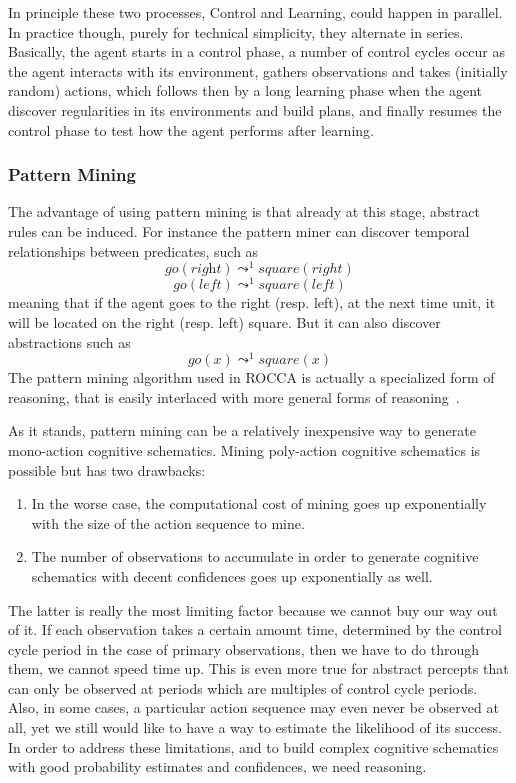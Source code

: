 \documentclass[runningheads]{llncs}
\newcommand{\lpreimp}[1]{\leadsto^{#1}}
\newcommand{\lgo}[1]{\textit{go}(#1)}
\begin{document}
In principle these two processes, Control and Learning, could happen
in parallel.  In practice though, purely for technical simplicity,
they alternate in series.  Basically, the agent starts in a control
phase, a number of control cycles occur as the agent interacts with
its environment, gathers observations and takes (initially random)
actions, which follows then by a long learning phase when the agent
discover regularities in its environments and build plans, and finally
resumes the control phase to test how the agent performs after
learning.

\subsubsection{Pattern Mining}

The advantage of using pattern mining is that already at this stage,
abstract rules can be induced.  For instance the pattern miner can
discover temporal relationships between predicates, such as
$$\lgo{\textit{right}} \lpreimp{1} square(right)$$
$$go(left) \lpreimp{1} square(left)$$
meaning that if the agent goes to the right (resp. left), at the next
time unit, it will be located on the right (resp. left) square.  But
it can also discover abstractions such as
$$\lgo{x} \lpreimp{1} square(x)$$
The pattern mining algorithm used in ROCCA is actually a specialized
form of reasoning, that is easily interlaced with more general forms
of reasoning~\cite{Geisweiller2019}.

As it stands, pattern mining can be a relatively inexpensive way to
generate mono-action cognitive schematics.  Mining poly-action
cognitive schematics is possible but has two drawbacks:
\begin{enumerate}
\item In the worse case, the computational cost of mining goes up
  exponentially with the size of the action sequence to mine.
\item The number of observations to accumulate in order to generate
  cognitive schematics with decent confidences goes up exponentially
  as well.
\end{enumerate}
The latter is really the most limiting factor because we cannot buy
our way out of it.  If each observation takes a certain amount time,
determined by the control cycle period in the case of primary
observations, then we have to do through them, we cannot speed time
up.  This is even more true for abstract percepts that can only be
observed at periods which are multiples of control cycle periods.
Also, in some cases, a particular action sequence may even never be
observed at all, yet we still would like to have a way to estimate the
likelihood of its success.  In order to address these limitations, and
to build complex cognitive schematics with good probability estimates
and confidences, we need reasoning.
\end{document}
